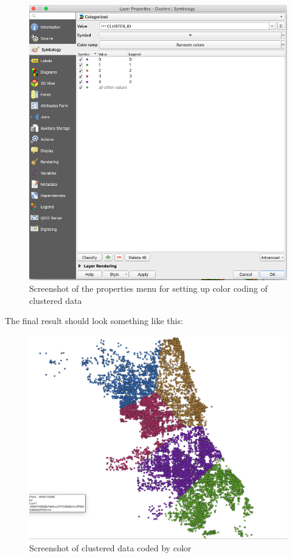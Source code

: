 \documentclass[]{book}
\begin{document}
\begin{figure}
\centering
\includegraphics{images/clustering_symb_menu.png}
\caption{Screenshot of the properties menu for setting up color coding of clustered data}
\end{figure}

The final result should look something like this:

\begin{figure}
\centering
\includegraphics{images/clustering_qgis3.png}
\caption{Screenshot of clustered data coded by color}
\end{figure}
\end{document}

